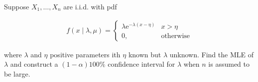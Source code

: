 
\begin{exercise}

Suppose $X_1, \dots, X_n$ are i.i.d. with pdf

\begin{align*}
    f(x \mid \lambda, \mu)
    =
    \begin{cases}
        \lambda \mathrm e^{-\lambda (x - \eta)}
        & x > \eta \\
        0,
        & \text{otherwise}
    \end{cases}
\end{align*}

where $\lambda$ and $\eta$ positive parameters ith $\eta$ known but $\lambda$ unknown.
Find the MLE of $\lambda$ and construct a $(1 - \alpha) 100 \%$ confidence interval for $\lambda$ when $n$ is assumed to be large.

\end{exercise}


\begin{solution}

\phantom{}

\end{solution}

